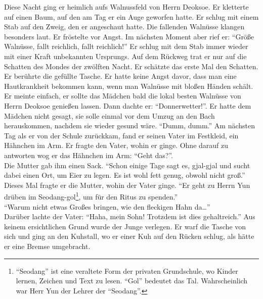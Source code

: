 \documentclass[prd,12pt,tightenlines,notitlepage,nofootinbib]{revtex4-1}
\begin{document}
Diese Nacht ging er heimlich aufs Walnussfeld von Herrn Deoksoe.
Er kletterte auf einen Baum, auf den am Tag er ein Auge geworfen hatte.
Er schlug mit einem Stab auf den Zweig, den er angeschaut hatte.
Die fallenden Walnüsse klangen besonders laut.
Er fröstelte vor Angst.
Im nächsten Moment aber rief er: "`Größe Walnüsse, fallt reichlich, fallt reichlich!"'
Er schlug mit dem Stab immer wieder mit einer Kraft unbekannten Ursprungs.
Auf dem Rückweg trat er nur auf die Schatten des Mondes der zwölften Nacht.
Er schätzte das erste Mal den Schatten.
Er berührte die gefüllte Tasche.
Er hatte keine Angst davor, dass
man eine Hautkrankheit bekommen kann, wenn
man Walnüsse mit bloßen Händen schält.
Er meinte einfach,
er sollte das Mädchen bald die lokal besten Walnüsse von Herrn Deoksoe
genießen lassen.
Dann dachte er: "`Donnerwetter!"'.
Er hatte dem Mädchen nicht gesagt,
sie solle einmal vor dem Umzug an den Bach herauskommen,
nachdem sie wieder gesund wäre.
"`Dumm, dumm."'
Am nächsten Tag als er von der Schule zurückkam,
fand er seinen Vater im Festkleid, ein Hähnchen im Arm. %
Er fragte den Vater, wohin er ginge.
Ohne darauf zu antworten wog er das Hähnchen im Arm:
"`Geht das?"'.
\\ Die Mutter gab ihm einen Sack.
"`Schon einige Tage sagt es, gjal-gjal
und sucht dabei einen Ort, um Eier zu legen.
Es ist wohl fett genug, obwohl nicht groß."'
Dieses Mal fragte er die Mutter, wohin der Vater ginge.
"`Er geht zu Herrn Yun drüben im Seodang-gol\footnote{
"`Seodang"' ist eine veraltete Form der privaten Grundschule,
wo Kinder lernen,
Zeichen und Text zu lesen.
"`Gol"' bedeutet das Tal.
Wahrscheinlich war Herr Yun der Lehrer der "`Seodang"'.},
um für den Ritus zu spenden."'
\\ "`Warum nicht etwas Großes bringen, wie den fleckigen Hahn da\ldots"'
\\ Darüber lachte der Vater: "`Haha, mein Sohn!
Trotzdem ist dies gehaltreich."'
Aus keinem ersichtlichen Grund wurde der Junge verlegen.
Er warf die Tasche von sich und ging an den Kuhstall,
wo er einer Kuh auf den Rücken schlug,
als hätte er eine Bremse umgebracht.
\end{document}
